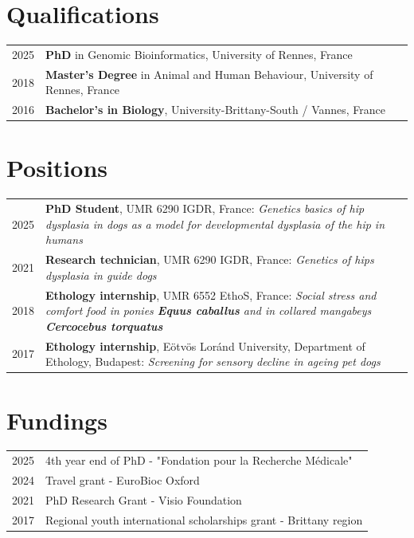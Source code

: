 \documentclass[11pt,a4paper]{moderncv}
\begin{document}
\makecvtitle

\section{Qualifications}
\begin{tabularx}{\textwidth}{p{} X}
    2025 & \textbf{PhD} in Genomic Bioinformatics, University of Rennes, France \\
    2018 & \textbf{Master's Degree} in Animal and Human Behaviour, University of Rennes, France \\
    2016 & \textbf{Bachelor's in Biology}, University-Brittany-South / Vannes, France \\
\end{tabularx}

\section{Positions}
\begin{tabularx}{\textwidth}{p{} X}
    2025 & \textbf{PhD Student}, UMR 6290 IGDR, France: \textit{Genetics basics of hip dysplasia in dogs as a model for developmental dysplasia of the hip in humans} \\
    2021 & \textbf{Research technician}, UMR 6290 IGDR, France: \textit{Genetics of hips dysplasia in guide dogs} \\
    2018 & \textbf{Ethology internship}, UMR 6552 EthoS, France: \textit{Social stress and comfort food in ponies \textbf{Equus caballus} and in collared mangabeys \textbf{Cercocebus torquatus}} \\
    2017 & \textbf{Ethology internship}, Eötvös Loránd University, Department of Ethology, Budapest: \textit{Screening for sensory decline in ageing pet dogs} \\    
\end{tabularx}

\section{Fundings}
\begin{tabularx}{\textwidth}{p{} X}
    2025 & 4th year end of PhD - "Fondation pour la Recherche Médicale" \\
    2024 & Travel grant - EuroBioc Oxford \\
    2021 & PhD Research Grant - Visio Foundation \\
    2017 & Regional youth international scholarships grant - Brittany region \\
\end{tabularx}
\end{document}
